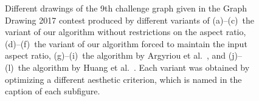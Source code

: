 \documentclass{comjnl}
\begin{document}
\begin{figure}[htbp]
	\hfill
	\hfill
	\caption{Different drawings of the 9th challenge graph given in the Graph Drawing 2017 contest produced by different variants of
	(a)--(c)~the variant of our algorithm without restrictions on the aspect ratio, 
	(d)--(f)~the variant of our algorithm forced to maintain the input aspect ratio,
	(g)--(i)~the algorithm by Argyriou et al.~\cite{DBLP:journals/cj/ArgyriouBS13}, and
	(j)--(l)~the algorithm by Huang et al.~\cite{DBLP:journals/vlc/HuangEHL13}.
	Each variant was obtained by optimizing a different aesthetic criterion, which is named in the caption of each subfigure.}
	\label{fig:graph9}
\end{figure}
\end{document}
